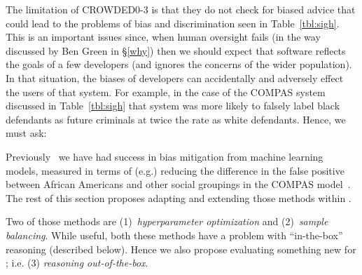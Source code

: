 The limitation of CROWDED0-3 is that they do not check for biased advice that 
could lead to the problems of bias and discrimination seen in Table~\ref{tbl:sigh}. 
This is an important issues since, when
    human oversight fails (in the way  discussed by Ben Green in
  \S\ref{why}) then we should
 expect that   software reflects the goals of a few developers (and ignores the concerns of  the wider population).
In that situation, the biases of developers can accidentally and adversely effect the users of that system.  For example, 
 in the case of the COMPAS system discussed in Table~\ref{tbl:sigh} 
 that system was   more likely to falsely label black defendants as future criminals at twice the rate as white defendants.
Hence, we must ask:




 
 Previously~\cite{Chakraborty_2020,fse21} we have had   success in bias  mitigation
 from machine learning models, measured
 in terms of  (e.g.) reducing the 
  difference in the false positive between African Americans and other social groupings in
 the COMPAS model~\cite{Machine_Bias}. The rest of this section proposes
 adapting and extending those methods within .
 
 Two of those methods are (1)~{\em hyperparameter optimization}
 and (2)~{\em sample balancing}. While useful,  both these methods have
         a problem with ``in-the-box'' reasoning (described below).
         Hence we also propose evaluating something  new for
  ; i.e.  (3) {\em reasoning  out-of-the-box}. 
 
